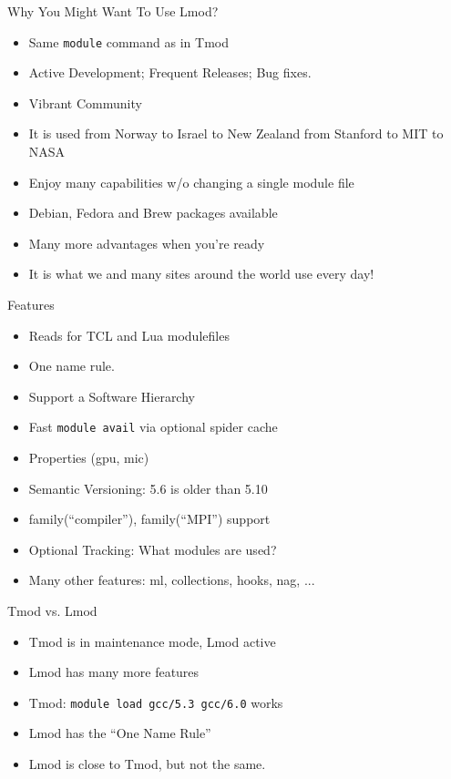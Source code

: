 \documentclass[dvipsnames,aspectratio=169]{beamer}
\begin{document}
\begin{frame}{Why You Might Want To Use Lmod?}
  \begin{itemize}
    \item Same \texttt{module} command as in Tmod
    \item Active Development;  Frequent Releases; Bug fixes.
    \item Vibrant Community
    \item It is used from Norway to Israel to New Zealand from Stanford to MIT to NASA
    \item Enjoy many capabilities w/o changing a single module file
    \item Debian, Fedora and Brew packages available
    \item Many more advantages when you're ready
    \item It is what we and many sites around the world use every day!
  \end{itemize}
\end{frame}

\begin{frame}{Features}
  \begin{itemize}
    \item Reads for TCL and Lua modulefiles
    \item One name rule.
    \item Support a Software Hierarchy
    \item Fast \texttt{module avail} via optional spider cache 
    \item Properties (gpu, mic)
    \item Semantic Versioning:  5.6 is older than 5.10
    \item family(``compiler''), family(``MPI'') support
    \item Optional Tracking: What modules are used?
    \item Many other features: ml, collections, hooks, nag, ...
  \end{itemize}
\end{frame}

\begin{frame}{Tmod vs. Lmod}
  \begin{itemize}
    \item Tmod is in maintenance mode, Lmod active
    \item Lmod has many more features
    \item Tmod: \texttt{module load gcc/5.3 gcc/6.0} works
    \item Lmod has the ``One Name Rule''
    \item Lmod is close to Tmod, but not the same.
  \end{itemize}
\end{frame}
\end{document}
